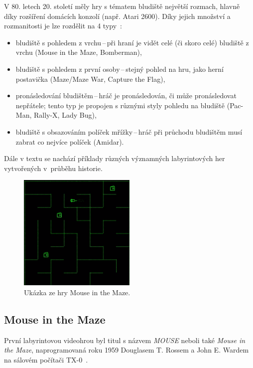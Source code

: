 V 80. letech 20. století měly hry s tématem bludiště největší rozmach, hlavně díky rozšíření domácích konzolí (např. Atari 2600). Díky jejich množství a rozmanitosti je lze rozdělit na 4 typy~\cite{DoYouMaze}:
\begin{itemize}
    \item bludiště s pohledem z vrchu\,--\,při hraní je vidět celé (či skoro celé) bludiště z vrchu (Mouse in the Maze, Bomberman),
    \item bludiště s pohledem z první osoby\,--\,stejný pohled na hru, jako herní postavička (Maze/Maze War, Capture the Flag),
    \item pronásledování bludištěm\,--\,hráč je pronásledován, či může pronásledovat nepřátele; tento typ je propojen s různými styly pohledu na bludiště (Pac-Man, Rally-X, Lady Bug),
    \item bludiště s obsazováním políček mřížky\,--\,hráč při průchodu bludištěm musí zabrat co nejvíce políček (Amidar).
\end{itemize}

\noindent Dále v textu se nachází příklady různých významných labyrintových her vytvořených v~průběhu historie.

\begin{figure}[H]
	\centering
	\includegraphics[width=0.5\textwidth]{obrazky-figures/ch2/MOUSE.png}
	\caption{Ukázka ze hry Mouse in the Maze.~\cite{Videogamehistorian}}
	\label{fig:mouse}
\end{figure}

\subsection*{Mouse in the Maze}
První labyrintovou videohrou byl titul s názvem \textit{MOUSE} neboli také \textit{Mouse in the Maze}, naprogramovaná roku 1959  Douglasem T. Rossem a John E. Wardem na sálovém počítači TX-0~\cite{TheOriginOfSpacewar}. 

